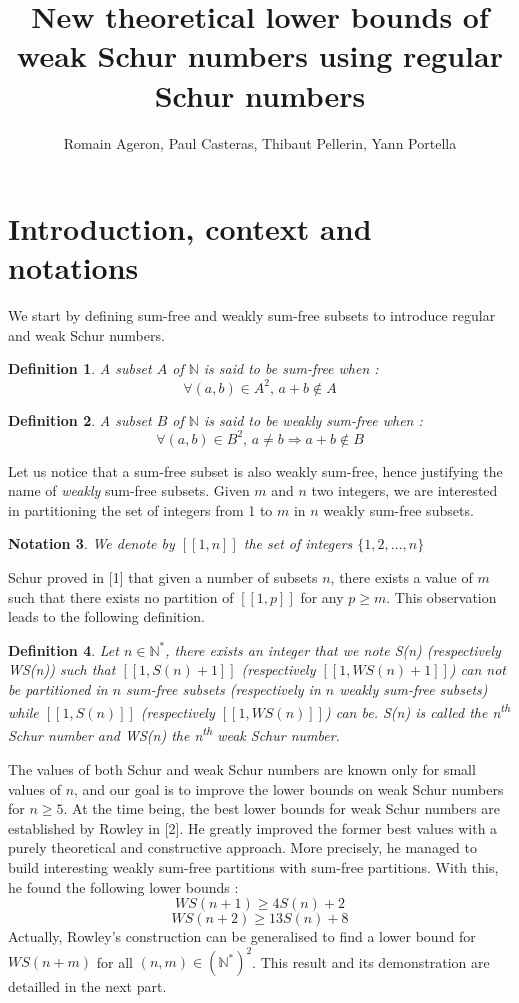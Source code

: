 \documentclass{article}
\title{New theoretical lower bounds of weak Schur numbers using regular Schur numbers}
\author{Romain Ageron, Paul Casteras, Thibaut Pellerin, Yann Portella}
\newtheorem{definition}{Definition}[section]
\newtheorem{notation}[definition]{Notation}
\begin{document}
\maketitle
\section{Introduction, context and notations}
We start by defining sum-free and weakly sum-free subsets to introduce regular and weak Schur numbers.
\begin{definition}
A subset $A$ of $\mathbb{N}$ is said to be sum-free when :
\[ \forall (a,b) \in A^2 \text{, } a+b \notin A
\]
\end{definition}
\begin{definition}
A subset $B$ of $\mathbb{N}$ is said to be weakly sum-free when :
\[ \forall (a,b) \in B^2 \text{, } a \neq b \Longrightarrow a+b \notin B
\]
\end{definition}
Let us notice that a sum-free subset is also weakly sum-free, hence justifying the name of \textit{weakly} sum-free subsets. Given $m$ and $n$ two integers, we are interested in partitioning the set of integers from 1 to $m$ in $n$ weakly sum-free subsets.
\begin{notation}
We denote by $[\![1,n]\!]$ the set of integers $\{1, 2, ..., n\}$
\end{notation}
Schur proved in [1] that given a number of subsets $n$, there exists a value of $m$ such that there exists no partition of $[\![1,p]\!]$ for any $p \geqslant m$. This observation leads to the following definition.
\begin{definition}
Let $n \in \mathbb{N}^*$, there exists an integer that we note S(n) (\textit{respectively WS(n)}) such that $[\![1,S(n) + 1]\!]$ (respectively $[\![1,WS(n) + 1]\!]$) can not be partitioned in $n$ sum-free subsets (respectively in $n$ weakly sum-free subsets) while $[\![1,S(n)]\!]$ (respectively $[\![1,WS(n)]\!]$) can be. S(n) is called the n\textsuperscript{th} Schur number and WS(n) the n\textsuperscript{th} weak Schur number.
\end{definition}
The values of both Schur and weak Schur numbers are known only for small values of $n$, and our goal is to improve the lower bounds on weak Schur numbers for $n \geqslant 5$. At the time being, the best lower bounds for weak Schur numbers are established by Rowley in [2]. He greatly improved the former best values with a purely theoretical and constructive approach. More precisely, he managed to build interesting weakly sum-free partitions with sum-free partitions. With this, he found the following lower bounds :
\[ WS(n+1) \geqslant 4S(n) + 2
\]
\[
WS(n+2) \geqslant 13S(n) + 8
\]
Actually, Rowley's construction can be generalised to find a lower bound for $WS(n+m)$ for all $(n,m) \in (\mathbb{N}^*)^2$. This result and its demonstration are detailled in the next part.
\end{document}
